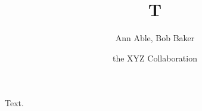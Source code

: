 \documentclass{aa}
\begin{document}
\title{T}
\author{Ann Able, Bob Baker \and the XYZ Collaboration}
\maketitle
Text.
\end{document}
